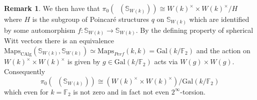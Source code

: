 \documentclass{article}
\DeclareMathOperator{\Picp}{Pic^p} %
\theoremstyle{definition}
\newtheorem{remark}[equation]{Remark}
\begin{document}
\begin{remark}
We then have that $\pi_0(\Picp(\mathbb{S}_{W(k)}))\cong W(k)^\times \times W(k)^\times/H$ where $H$ is the subgroup of Poincar{\'e} structures $q$ on $\mathbb{S}_{W(k)}$ which are identified by some automorphism $f:\mathbb{S}_{W(k)}\to \mathbb{S}_{W(k)}$. By the defining property of spherical Witt vectors there is an equivalence $\mathrm{Maps}_{\mathrm{CAlg}}(\mathbb{S}_{W(k)}, \mathbb{S}_{W(k)})\simeq \mathrm{Maps}_{Perf}(k,k)=\mathrm{Gal}(k/\mathbb{F}_2)$ and the action on $W(k)^\times \times W(k)^\times$ is given by $g\in \mathrm{Gal}(k/\mathbb{F}_2)$ acts via $W(g)\times W(g)$. Consequently \[\pi_0(\Picp(\mathbb{S}_{W(k)}))\cong (W(k)^\times \times W(k)^\times) /\mathrm{Gal}(k/\mathbb{F}_2)\] which even for $k=\mathbb{F}_2$ is not zero and in fact not even $2^\infty$-torsion. 
\end{remark}
\end{document}

